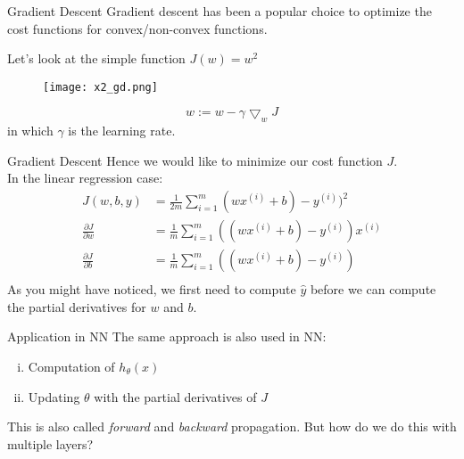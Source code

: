 \documentclass{beamer}
\begin{document}
\begin{frame}[t]{Gradient Descent}
  Gradient descent has been a popular choice to optimize the cost functions for convex/non-convex functions.

  Let's look at the simple function $J(w) = w^2$
  \begin{figure}[htpb]
    \centering
    \texttt{[image: x2\_gd.png]}
  \end{figure}
  \begin{equation}
    w := w - \gamma \bigtriangledown_wJ
  \end{equation}
  in which $\gamma$ is the learning rate.
\end{frame}

\begin{frame}[t]{Gradient Descent}
  Hence we would like to minimize our cost function $J$.
  \\
  In the linear regression case:
  \begin{equation}
    \begin{align*}
      J(w, b, y) &= \frac{1}{2m} \sum^m_{i=1} (wx^{(i)}+b) - y^{(i)})^2 \\
      \frac{\partial J}{\partial w} &= \frac{1}{m} \sum^m_{i=1} ((wx^{(i)}+b) - y^{(i)})x^{(i)} \\
      \frac{\partial J}{\partial b} &= \frac{1}{m} \sum^m_{i=1} ((wx^{(i)}+b) - y^{(i)}) \\
    \end{align}
  \end{equation}
  As you might have noticed, we first need to compute $\hat{y}$ before we can compute the partial derivatives for $w$ and $b$.
\end{frame}

\begin{frame}[t]{Application in NN}
  The same approach is also used in NN:
  \begin{enumerate}[(i)]
    \item Computation of $h_\theta(x)$ 
    \item Updating $\theta$ with the partial derivatives of $J$
  \end{enumerate}
  This is also called \emph{forward} and \emph{backward} propagation.
  But how do we do this with multiple layers?
\end{frame}
\end{document}
